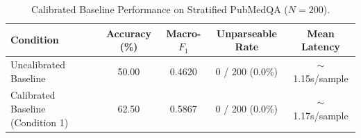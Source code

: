\begin{table}[h]
\centering
\caption{Calibrated Baseline Performance on Stratified PubMedQA ($N=200$).}
\label{tab:baseline_metrics}
\begin{tabular}{lcccc}
\toprule
\textbf{Condition} & \textbf{Accuracy (\%)} & \textbf{Macro-$F_1$} & \textbf{Unparseable Rate} & \textbf{Mean Latency} \\
\midrule
Uncalibrated Baseline & 50.00 & 0.4620 & 0 / 200 (0.0\%) & $\sim$1.15s/sample \\
Calibrated Baseline (Condition 1) & 62.50 & 0.5867 & 0 / 200 (0.0\%) & $\sim$1.17s/sample \\
\bottomrule
\end{tabular}
\end{table}
